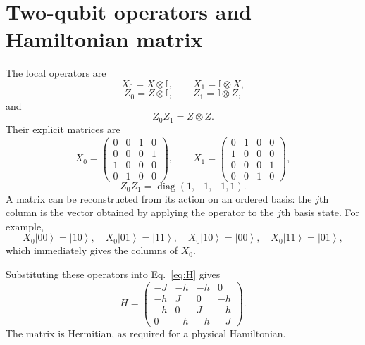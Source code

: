 \documentclass[11pt,a4paper]{article}
\newcommand{\ket}[1]{\left|#1\right\rangle}
\newcommand{\I}{\mathbb{I}}
\begin{document}
\section{Two-qubit operators and Hamiltonian matrix}

The local operators are
\begin{equation}
X_0=X\otimes \I,\qquad X_1=\I\otimes X,
\end{equation}
\begin{equation}
Z_0=Z\otimes \I,\qquad Z_1=\I\otimes Z,
\end{equation}
and
\begin{equation}
Z_0Z_1=Z\otimes Z.
\end{equation}
Their explicit matrices are
\begin{equation}
X_0=
\begin{pmatrix}
0&0&1&0\\
0&0&0&1\\
1&0&0&0\\
0&1&0&0
\end{pmatrix},\qquad
X_1=
\begin{pmatrix}
0&1&0&0\\
1&0&0&0\\
0&0&0&1\\
0&0&1&0
\end{pmatrix},
\end{equation}
\begin{equation}
Z_0Z_1=\operatorname{diag}(1,-1,-1,1).
\end{equation}
A matrix can be reconstructed from its action on an ordered basis: the $j$th column is the vector obtained by applying the operator to the $j$th basis state. For example,
\begin{equation}
X_0\ket{00}=\ket{10},\quad
X_0\ket{01}=\ket{11},\quad
X_0\ket{10}=\ket{00},\quad
X_0\ket{11}=\ket{01},
\end{equation}
which immediately gives the columns of $X_0$.

Substituting these operators into Eq.~\eqref{eq:H} gives
\begin{equation}
H=
\begin{pmatrix}
-J&-h&-h&0\\
-h&J&0&-h\\
-h&0&J&-h\\
0&-h&-h&-J
\end{pmatrix}.
\label{eq:Hmatrix}
\end{equation}
The matrix is Hermitian, as required for a physical Hamiltonian.
\end{document}

